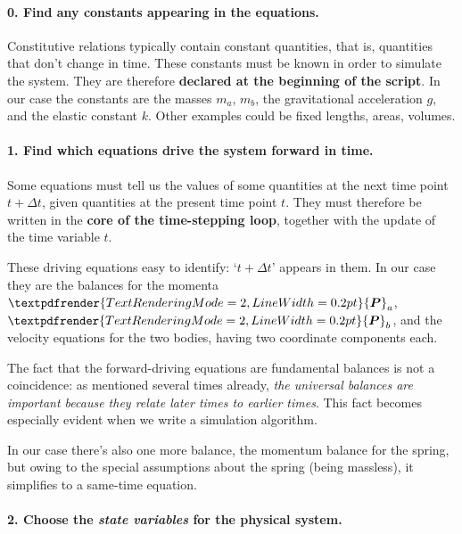 \documentclass[a4paper,12pt,%
onecolumn,oneside,%
british%
]{memoir}
\renewcommand*{\bm}[1]{\textpdfrender{TextRenderingMode=2,LineWidth=0.2pt}{\boldsymbol{#1}}}
\newcommand*{\incr}{\Delta}%
\renewcommand*{\|}[1][]{\nonscript\:#1\vert\nonscript\:\mathopen{}}
\newcommand*{\Dt}{\incr t}
\newcommand*{\ym}{m}%
\newcommand*{\yma}{\ym_{a}}
\newcommand*{\ymb}{\ym_{b}}
\newcommand*{\yP}{\bm{P}}
\newcommand*{\yPa}{\yP_{a}}
\newcommand*{\yPb}{\yP_{b}}
\begin{document}
\paragraph{\color{yellow}0. Find any constants appearing in the equations.}

Constitutive relations typically contain constant quantities, that is, quantities that don't change in time. These constants must be known in order to simulate the system. They are therefore \textbf{declared at the beginning of the script}. In our case the constants are the masses $\yma$, $\ymb$, the gravitational acceleration $g$, and the elastic constant $k$. Other examples could be fixed lengths, areas, volumes.

\paragraph{\color{green}1. Find which equations drive the system forward in time.}

Some equations must tell us the values of some quantities at the next time point $t+\Dt$, given quantities at the present time point $t$. They must therefore be written in the \textbf{core of the time-stepping loop}, together with the update of the time variable $t$.

These driving equations easy to identify: \enquote*{$t+\Dt$} appears in them. In our case they are the balances for the momenta $\yPa$, $\yPb$, and the velocity equations for the two bodies, having two coordinate components each.

  The fact that the forward-driving equations are fundamental balances is not a coincidence: as mentioned several times already, \emph{the universal balances are important because they relate later times to earlier times}. This fact becomes especially evident when we write a simulation algorithm.

  In our case there's also one more balance, the momentum balance for the spring, but owing to the special assumptions about the spring (being massless), it simplifies to a same-time equation.


\paragraph{\color{red}2. Choose the \emph{state variables} for the physical system.}
\end{document}
